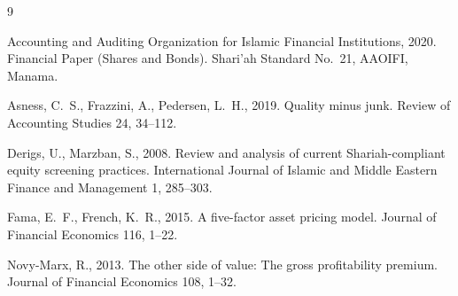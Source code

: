 \documentclass[11pt,letterpaper]{article}
\begin{document}

\begin{thebibliography}{9}

Accounting and Auditing Organization for Islamic Financial Institutions, 2020.
\newblock Financial Paper (Shares and Bonds).
\newblock Shari'ah Standard No.~21, AAOIFI, Manama.

Asness, C.~S., Frazzini, A., Pedersen, L.~H., 2019.
\newblock Quality minus junk.
\newblock Review of Accounting Studies 24, 34--112.

Derigs, U., Marzban, S., 2008.
\newblock Review and analysis of current Shariah-compliant equity screening practices.
\newblock International Journal of Islamic and Middle Eastern Finance and Management 1, 285--303.

Fama, E.~F., French, K.~R., 2015.
\newblock A five-factor asset pricing model.
\newblock Journal of Financial Economics 116, 1--22.

Novy-Marx, R., 2013.
\newblock The other side of value: The gross profitability premium.
\newblock Journal of Financial Economics 108, 1--32.

\end{thebibliography}
\end{document}
